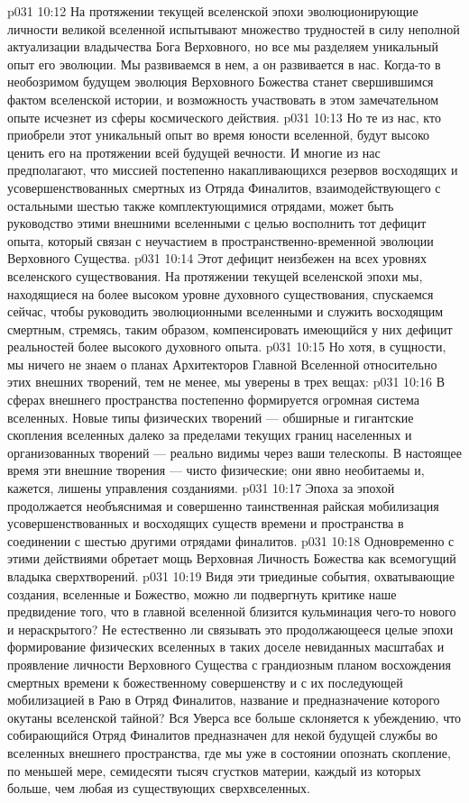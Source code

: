 \vs p031 10:12 На протяжении текущей вселенской эпохи эволюционирующие личности великой вселенной испытывают множество трудностей в силу неполной актуализации владычества Бога Верховного, но все мы разделяем уникальный опыт его эволюции. Мы развиваемся в нем, а он развивается в нас. Когда\hyp{}то в необозримом будущем эволюция Верховного Божества станет свершившимся фактом вселенской истории, и возможность участвовать в этом замечательном опыте исчезнет из сферы космического действия.
\vs p031 10:13 Но те из нас, кто приобрели этот уникальный опыт во время юности вселенной, будут высоко ценить его на протяжении всей будущей вечности. И многие из нас предполагают, что миссией постепенно накапливающихся резервов восходящих и усовершенствованных смертных из Отряда Финалитов, взаимодействующего с остальными шестью также комплектующимися отрядами, может быть руководство этими внешними вселенными с целью восполнить тот дефицит опыта, который связан с неучастием в пространственно\hyp{}временной эволюции Верховного Существа.
\vs p031 10:14 Этот дефицит неизбежен на всех уровнях вселенского существования. На протяжении текущей вселенской эпохи мы, находящиеся на более высоком уровне духовного существования, спускаемся сейчас, чтобы руководить эволюционными вселенными и служить восходящим смертным, стремясь, таким образом, компенсировать имеющийся у них дефицит реальностей более высокого духовного опыта.
\vs p031 10:15 Но хотя, в сущности, мы ничего не знаем о планах Архитекторов Главной Вселенной относительно этих внешних творений, тем не менее, мы уверены в трех вещах:
\vs p031 10:16 \bibnobreakspace В сферах внешнего пространства постепенно формируется огромная система вселенных. Новые типы физических творений --- обширные и гигантские скопления вселенных далеко за пределами текущих границ населенных и организованных творений --- реально видимы через ваши телескопы. В настоящее время эти внешние творения --- чисто физические; они явно необитаемы и, кажется, лишены управления созданиями.
\vs p031 10:17 \bibnobreakspace Эпоха за эпохой продолжается необъяснимая и совершенно таинственная райская мобилизация усовершенствованных и восходящих существ времени и пространства в соединении с шестью другими отрядами финалитов.
\vs p031 10:18 \bibnobreakspace Одновременно с этими действиями обретает мощь Верховная Личность Божества как всемогущий владыка сверхтворений.
\vs p031 10:19 \pc Видя эти триединые события, охватывающие создания, вселенные и Божество, можно ли подвергнуть критике наше предвидение того, что в главной вселенной близится кульминация чего\hyp{}то нового и нераскрытого? Не естественно ли связывать это продолжающееся целые эпохи формирование физических вселенных в таких доселе невиданных масштабах и проявление личности Верховного Существа с грандиозным планом восхождения смертных времени к божественному совершенству и с их последующей мобилизацией в Раю в Отряд Финалитов, название и предназначение которого окутаны вселенской тайной? Вся Уверса все больше склоняется к убеждению, что собирающийся Отряд Финалитов предназначен для некой будущей службы во вселенных внешнего пространства, где мы уже в состоянии опознать скопление, по меньшей мере, семидесяти тысяч сгустков материи, каждый из которых больше, чем любая из существующих сверхвселенных.
